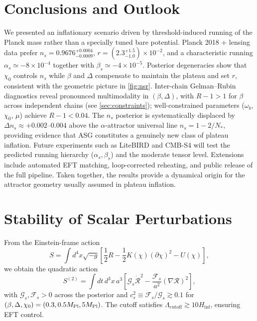 \documentclass[11pt,a4paper]{article}
\begin{document}
\section{Conclusions and Outlook}
We presented an inflationary scenario driven by threshold-induced running of the Planck mass rather than a specially tuned bare potential. Planck 2018 + lensing data prefer $n_{s}=0.9676^{+0.0004}_{-0.0009}$, $r=(2.3^{+1.5}_{-1.0})\times10^{-2}$, and a characteristic running $\alpha_{s}\simeq-8\times10^{-4}$ together with $\beta_{s}\simeq-4\times10^{-5}$. Posterior degeneracies show that $\chi_{0}$ controls $n_{s}$ while $\beta$ and $\Delta$ compensate to maintain the plateau and set $r$, consistent with the geometric picture in \cref{fig:nsr}. Inter-chain Gelman--Rubin diagnostics reveal pronounced multimodality in $(\beta,\Delta)$, with $R{-}1>1$ for $\beta$ across independent chains (see \cref{sec:constraints}); well-constrained parameters ($\omega_b$, $\chi_0$, $\mu$) achieve $R{-}1<0.04$. The $n_s$ posterior is systematically displaced by $\Delta n_s\approx+0.002$--$0.004$ above the $\alpha$-attractor universal line $n_s=1-2/N_*$, providing evidence that ASG constitutes a genuinely new class of plateau inflation. Future experiments such as LiteBIRD and CMB-S4 will test the predicted running hierarchy ($\alpha_{s},\beta_{s}$) and the moderate tensor level. Extensions include automated EFT matching, loop-corrected reheating, and public release of the full pipeline. Taken together, the results provide a dynamical origin for the attractor geometry usually assumed in plateau inflation.

\section{Stability of Scalar Perturbations}
\label{sec:stability}
From the Einstein-frame action
\begin{equation}
S=\int d^{4}x\sqrt{-g}\left[\frac{1}{2}R-\frac{1}{2}K(\chi)(\partial\chi)^{2}-U(\chi)\right],
\end{equation}
we obtain the quadratic action
\begin{equation}
S^{(2)}=\int dt\,d^{3}x\,a^{3}\left[\mathcal{G}_{s}\dot{\mathcal{R}}^{2}-\frac{\mathcal{F}_{s}}{a^{2}}(\nabla\mathcal{R})^{2}\right],
\end{equation}
with $\mathcal{G}_{s},\mathcal{F}_{s}>0$ across the posterior and $c_{s}^{2}\equiv\mathcal{F}_{s}/\mathcal{G}_{s}\gtrsim0.1$ for $(\beta,\Delta,\chi_{0})=(0.3,0.5M_{\rm Pl},5M_{\rm Pl})$. The cutoff satisfies $\Lambda_{\text{cutoff}}\gtrsim10H_{\text{inf}}$, ensuring EFT control.
\end{document}
